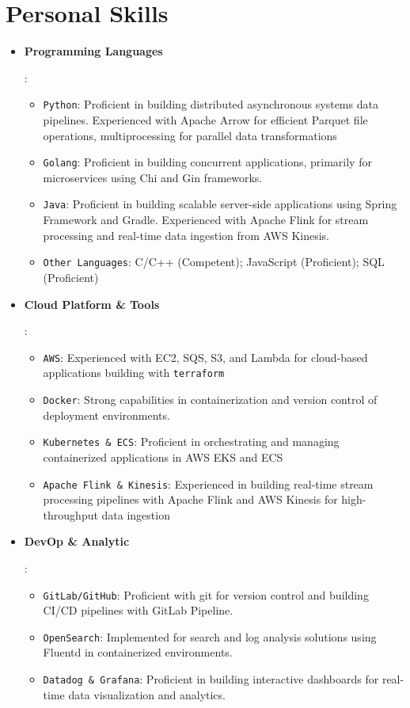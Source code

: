 \documentclass[letterpaper,11pt]{article}
\newcommand{\resumeItem}[2]{
  \item\small{
    \textbf{#1}{: #2 \vspace{-2pt}}
  }
}
\newcommand{\resumeSubItem}[2]{
  \item\small{
    \texttt{#1}{: #2 \vspace{-1pt}}
  }
}
\newcommand{\resumeItemListStart}{\begin{itemize}[leftmargin=*]}
\newcommand{\resumeItemListEnd}{\end{itemize}\vspace{-2pt}}
\newcommand{\resumeSubItemListStart}{\begin{itemize}[leftmargin=*]\vspace{-5pt}}
\newcommand{\resumeSubItemListEnd}{\end{itemize}\vspace{-5pt}}
\begin{document}
\section{Personal Skills}
    \resumeItemListStart
        \resumeItem{Programming Languages}{
          \resumeSubItemListStart
            \resumeSubItem{Python}{Proficient in building distributed asynchronous systems data pipelines. Experienced with Apache Arrow for efficient Parquet file operations, multiprocessing for parallel data transformations}
            \resumeSubItem{Golang}{Proficient in building concurrent applications, primarily for microservices using Chi and Gin frameworks.}
            \resumeSubItem{Java}{Proficient in building scalable server-side applications using Spring Framework and Gradle. Experienced with Apache Flink for stream processing and real-time data ingestion from AWS Kinesis.}
            \resumeSubItem{Other Languages}{C/C++ (Competent); JavaScript (Proficient); SQL (Proficient)}
          \resumeSubItemListEnd
        }
        \resumeItem{Cloud Platform \& Tools}{
          \resumeSubItemListStart
            \resumeSubItem{AWS}{Experienced with EC2, SQS, S3, and Lambda for cloud-based applications building with \texttt{terraform}}
            \resumeSubItem{Docker}{Strong capabilities in containerization and version control of deployment environments.}
            \resumeSubItem{Kubernetes \& ECS}{Proficient in orchestrating and managing containerized applications in AWS EKS and ECS}
            \resumeSubItem{Apache Flink \& Kinesis}{Experienced in building real-time stream processing pipelines with Apache Flink and AWS Kinesis for high-throughput data ingestion}
          \resumeSubItemListEnd
        }
        \resumeItem{DevOp \& Analytic}{
          \resumeSubItemListStart
            \resumeSubItem{GitLab/GitHub}{Proficient with git for version control and building CI/CD pipelines with GitLab Pipeline.}
            \resumeSubItem{OpenSearch}{Implemented for search and log analysis solutions using Fluentd in containerized environments.}
            \resumeSubItem{Datadog \& Grafana}{Proficient in building interactive dashboards for real-time data visualization and analytics.}
          \resumeSubItemListEnd
        }
    \resumeItemListEnd
    
\end{document}
